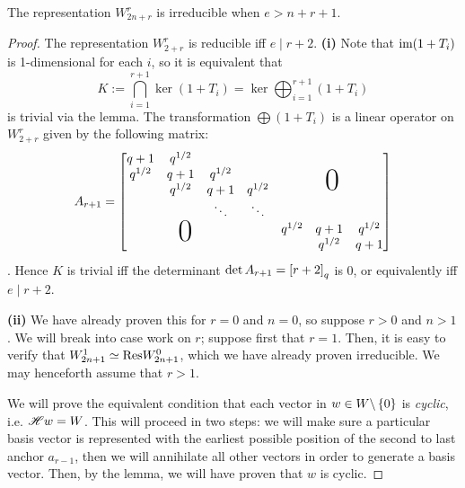 \documentclass{amsart}
\begin{document}
\begin{proposition}
  The representation $W_{2n + r}^r$ is irreducible when $e > n + r + 1$. 
\end{proposition}
\begin{proof}
  \def\sectionsep{7pt}
  \iffalse %
  The representation $W_{2+r}^r$ is reducible iff $e \mid r+2$.
  \textbf{(i)}
  Note that $\text{im} (1 + T_i)$ is 1-dimensional for each $i$, so it is equivalent that 
  \[K := \bigcap_{i=1}^{r+1} \ker(1 + T_i) = \ker \bigoplus_{i=1}^{r+1} (1 + T_i)\] 
  is trivial via the lemma.
  The transformation $\bigoplus (1 + T_i)$ is a linear operator on $W_{2 + r}^r$ given by the following matrix:
  \newcommand*\bigzero{\makebox(0,15){\text{\Huge0}}}
  \newcommand*\bigzerotwo{\makebox(-20,15){\text{\Huge0}}}
  \[
    A_{r + 1} = 
    \begin{bmatrix}
      \begin{matrix}
      q + 1 & q^{1/2} & \\
      q^{1/2} & q + 1 & q^{1/2}\\
      & q^{1/2} & q + 1 & q^{1/2}\\
      &  & \ddots & \ddots
      \end{matrix}
      &   \bigzero\\
      \bigzerotwo & \begin{matrix}
        q^{1/2} & q+1 & q^{1/2}\\
        &  q^{1/2} & q + 1
       \end{matrix}
    \end{bmatrix}
  \].
  Hence $K$ is trivial iff the determinant $\det A_{r + 1} = \left[ r + 2 \right]_q$ is 0, or equivalently iff $e \mid r + 2$.

  \vspace{\sectionsep}
  \textbf{(ii)}
  We have already proven this for $r = 0$ and $n = 0$, so suppose $r > 0$ and $n > 1$.
  We will break into case work on $r$;
  suppose first that $r = 1$.
  Then, it is easy to verify that $W_{2n + 1}^1 \simeq \text{Res} W_{2n + 1}^0$, which we have already proven irreducible.
  We may henceforth assume that $r > 1$.

  We will prove the equivalent condition that each vector in $w \in W\backslash \left\{ 0 \right\}$ is \emph{cyclic}, i.e. $\mathscr{H} w = W$.
  This will proceed in two steps: we will make sure a particular basis vector is represented with the earliest possible position of the second to last anchor $a_{r-1}$, then we will annihilate all other vectors in order to generate a basis vector.
  Then, by the lemma, we will have proven that $w$ is cyclic.


\end{proof}
\end{document}
